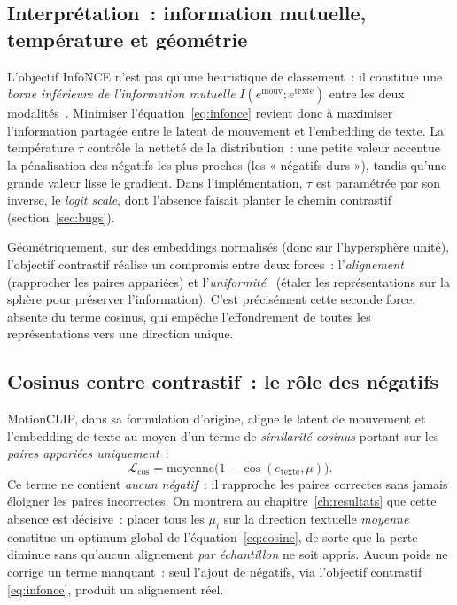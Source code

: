 \documentclass[12pt,a4paper,oneside]{report}
\theoremstyle{definition}
\theoremstyle{plain}
\begin{document}
\subsection{Interprétation~: information mutuelle, température et géométrie}

L'objectif InfoNCE n'est pas qu'une heuristique de classement~: il constitue une
\emph{borne inférieure de l'information mutuelle} $I(e^{\text{mouv}};e^{\text{texte}})$
entre les deux modalités~\cite{oord2018infonce}. Minimiser
l'équation~\eqref{eq:infonce} revient donc à maximiser l'information partagée entre
le latent de mouvement et l'embedding de texte. La température $\tau$ contrôle la
netteté de la distribution~: une petite valeur accentue la pénalisation des
négatifs les plus proches (les « négatifs durs »), tandis qu'une grande valeur
lisse le gradient. Dans l'implémentation, $\tau$ est paramétrée par son inverse, le
\emph{logit scale}, dont l'absence faisait planter le chemin contrastif
(section~\ref{sec:bugs}).

Géométriquement, sur des embeddings normalisés (donc sur l'hypersphère unité),
l'objectif contrastif réalise un compromis entre deux forces~: l'\emph{alignement}
(rapprocher les paires appariées) et l'\emph{uniformité}~\cite{wang2020uniformity} (étaler les
représentations sur la sphère pour préserver l'information). C'est précisément cette
seconde force, absente du terme cosinus, qui empêche l'effondrement de toutes les
représentations vers une direction unique.

\subsection{Cosinus contre contrastif~: le rôle des négatifs}

MotionCLIP, dans sa formulation d'origine, aligne le latent de mouvement et
l'embedding de texte au moyen d'un terme de \emph{similarité cosinus} portant sur
les \emph{paires appariées uniquement}~:
\begin{equation}
\mathcal{L}_{\cos} = \mathrm{moyenne}\big(1 - \cos(e_{\text{texte}}, \mu)\big).
\label{eq:cosine}
\end{equation}
Ce terme ne contient \emph{aucun négatif}~: il rapproche les paires correctes
sans jamais éloigner les paires incorrectes. On montrera au
chapitre~\ref{ch:resultats} que cette absence est décisive~: placer tous les
$\mu_i$ sur la direction textuelle \emph{moyenne} constitue un optimum global de
l'équation~\eqref{eq:cosine}, de sorte que la perte diminue sans qu'aucun
alignement \emph{par échantillon} ne soit appris. Aucun poids ne corrige un terme
manquant~: seul l'ajout de négatifs, via l'objectif contrastif
\eqref{eq:infonce}, produit un alignement réel.
\end{document}
